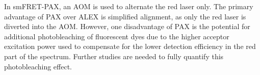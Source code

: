 In smFRET-PAX, an \ac{AOM} is used to alternate the red laser only. 
The primary advantage of \ac{PAX} over \ac{ALEX} is simplified alignment, as only the red laser is diverted into the \ac{AOM}. However, one disadvantage of \ac{PAX} is the potential for additional photobleaching of fluorescent dyes due to the higher acceptor excitation power used to compensate for the lower detection efficiency in the red part of the spectrum. 
Further studies are needed to fully quantify this photobleaching effect.

